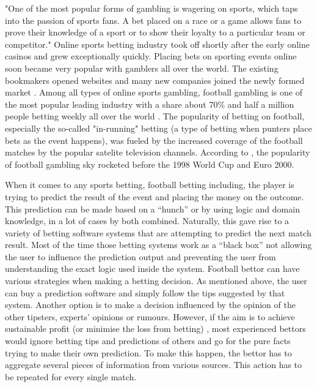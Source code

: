 "One of the most popular forms of gambling is wagering on sports, which taps into the passion of sports fans. A bet placed on a race or a game allows fans to prove their knowledge of a sport or to show their loyalty to a particular team or competitor."\citep{britannica2015gamblingandsports} Online sports betting industry took off shortly after the early online casinos and grew exceptionally quickly. Placing bets on sporting events online soon became very popular with gamblers all over the world. The existing bookmakers opened websites and many new companies joined the newly formed market \citep{source:gamblingsites}. Among all types of online sports gambling, football gambling is one of the most popular leading industry with a share about 70\% and half a million people betting weekly all over the world \citep{footballbettinggamblingindustry}. The popularity of betting on football, especially the so-called "in-running" betting (a type of betting when punters place bets as the event happens), was fueled by the increased coverage of the football matches by the popular satelite television channels. According to \citet{footballbettinggamblingindustry}, the popularity of football gambling sky rocketed before the 1998 World Cup and Euro 2000.

When it comes to any sports betting, football betting including, the player is trying to predict the result of the event and placing the money on the outcome. This prediction can be made based on a “hunch” or by using logic and domain knowledge, in a lot of cases by both combined. Naturally, this gave rise to a variety of betting software systems that are attempting to predict the next match result. Most of the time those betting systems work as a “black box” not allowing the user to influence the prediction output and preventing the user from understanding the exact logic used inside the system.
Football bettor can have various strategies when making a betting decision. As mentioned above, the user can buy a prediction software and simply follow the tips suggested by that system. Another option is to make a decision influenced by the opinion of the other tipsters, experts’ opinions or rumours. However, if the aim is to achieve sustainable profit (or minimise the loss from betting) , most experienced bettors would ignore betting tips and predictions of others and go for the pure facts trying to make their own prediction. To make this happen, the bettor has to aggregate several pieces of information from various sources. This action has to be repeated for every single match.

